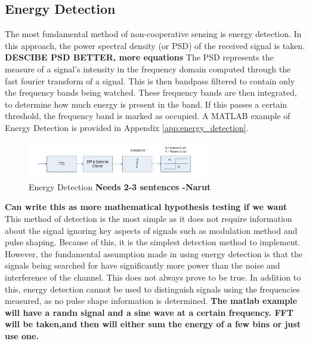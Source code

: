 \subsection{Energy Detection}
The most fundamental method of non-cooperative sensing is energy detection. In this approach, the power spectral density (or PSD) of the received signal is taken\cite{sensing_energy}. \textbf{DESCIBE PSD BETTER, more equations} The PSD represents the measure of a signal’s intensity in the frequency domain computed through the fast fourier transform of a signal. This is then bandpass filtered to contain only the frequency bands being watched. These frequency bands are then integrated, to determine how much energy is present in the band. If this passes a certain threshold, the frequency band is marked as occupied. A MATLAB example of Energy Detection is provided in Appendix \ref{app:energy_detection}.
\begin{figure}[ht]
\centering
\includegraphics[width=0.70\textwidth]{img/energy_detection.png}
\caption{Energy Detection \textbf{Needs 2-3 sentences -Narut}}
\label{fig:energy_detection}
\end{figure}\par

\textbf{Can write this as more mathematical hypothesis testing if we want}
This method of detection is the most simple as it does not require information about the signal ignoring key aspects of signals such as modulation method and pulse shaping. Because of this, it is the simplest detection method to implement. However, the fundamental assumption made in using energy detection is that the signals being searched for have significantly more power than the noise and interference of the channel. This does not always prove to be true. In addition to this, energy detection cannot be used to distinguish signals using the frequencies measured, as no pulse shape information is determined.
\textbf{The matlab example will have a randn signal and a sine wave at a certain frequency. FFT will be taken,and then will either sum the energy of a few bins or just use one.}

